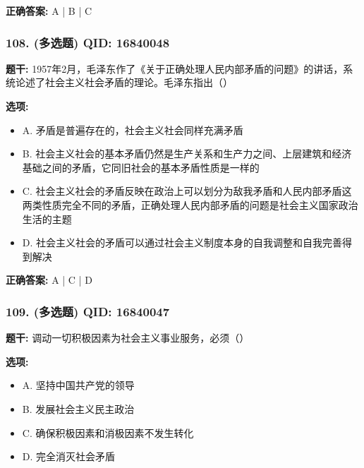 \documentclass[12pt,UTF8]{ctexart}
\begin{document}
\textbf{正确答案:}
A | B | C

\vspace{0.3em}\hrulefill\vspace{0.7em}

\subsubsection*{108. (多选题) \small QID: 16840048}

\textbf{题干:}
1957年2月，毛泽东作了《关于正确处理人民内部矛盾的问题》的讲话，系统论述了社会主义社会矛盾的理论。毛泽东指出（）

\textbf{选项:}
\begin{itemize}[leftmargin=*]

  \item A. 矛盾是普遍存在的，社会主义社会同样充满矛盾

  \item B. 社会主义社会的基本矛盾仍然是生产关系和生产力之间、上层建筑和经济基础之间的矛盾，它同旧社会的基本矛盾性质是一样的

  \item C. 社会主义社会的矛盾反映在政治上可以划分为敌我矛盾和人民内部矛盾这两类性质完全不同的矛盾，正确处理人民内部矛盾的问题是社会主义国家政治生活的主题

  \item D. 社会主义社会的矛盾可以通过社会主义制度本身的自我调整和自我完善得到解决

\end{itemize}

\textbf{正确答案:}
A | C | D

\vspace{0.3em}\hrulefill\vspace{0.7em}

\subsubsection*{109. (多选题) \small QID: 16840047}

\textbf{题干:}
调动一切积极因素为社会主义事业服务，必须（）

\textbf{选项:}
\begin{itemize}[leftmargin=*]

  \item A. 坚持中国共产党的领导

  \item B. 发展社会主义民主政治

  \item C. 确保积极因素和消极因素不发生转化

  \item D. 完全消灭社会矛盾

\end{itemize}
\end{document}
